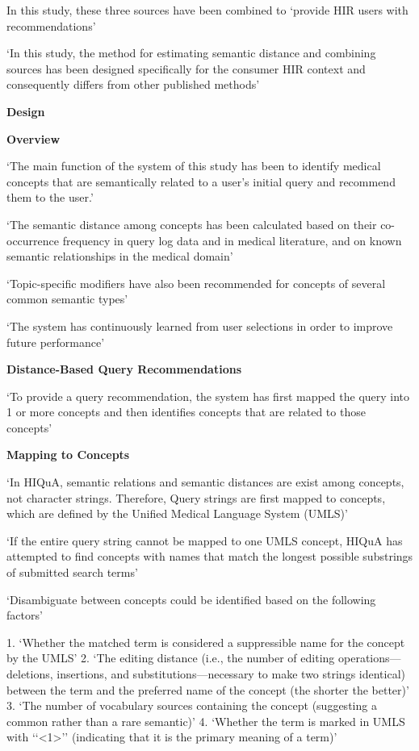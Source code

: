 \documentclass[]{article}
\begin{document}
In this study, these three sources have been combined to ‘provide HIR users with recommendations’

‘In this study, the method for estimating semantic distance and combining sources has been designed specifically for the consumer HIR context and consequently differs from other published methods’ 

\textbf{Design}

\textbf{Overview}

‘The main function of the system of this study has been to identify medical concepts that are semantically related to a user’s initial query and recommend them to the user.’

‘The semantic distance among concepts has been calculated based on their co-occurrence frequency in query log data and in medical literature, and on known semantic relationships in the medical domain’

‘Topic-specific modifiers have also been recommended for concepts of several common semantic types’

‘The system has continuously learned from user selections in order to improve future performance’

\textbf{Distance-Based Query Recommendations}

‘To provide a query recommendation, the system has first mapped the query into 1 or more concepts and then identifies concepts that are related to those concepts’

\textbf{Mapping to Concepts}

‘In HIQuA, semantic relations and semantic distances are exist among concepts, not character strings. Therefore, Query strings are first mapped to concepts, which are defined by the Unified Medical Language System (UMLS)’

‘If the entire query string cannot be mapped to one UMLS concept, HIQuA has attempted to find concepts with names that match the longest possible substrings of submitted search terms’

‘Disambiguate between concepts could be identified based on the following factors’

1.	‘Whether the matched term is considered a suppressible name for the concept by the UMLS’
2.	‘The editing distance (i.e., the number of editing operations— deletions, insertions, and substitutions—necessary to make two strings identical) between the term and the preferred name of the concept (the shorter the better)’
3.	‘The number of vocabulary sources containing the concept (suggesting a common rather than a rare semantic)’
4.	‘Whether the term is marked in UMLS with ‘‘<1>’’ (indicating that it is the primary meaning of a term)’
\end{document}
